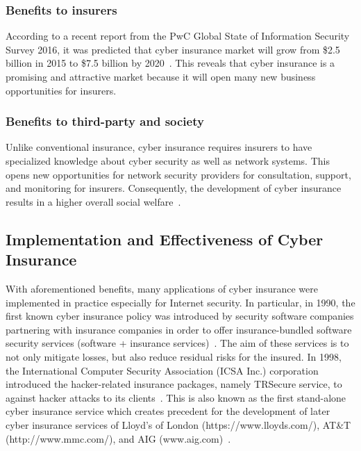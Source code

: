 \documentclass[twocolumn,10pt]{IEEEtran}
\begin{document}
\subsubsection{Benefits to insurers} 

According to a recent report from the PwC Global State of Information Security Survey 2016, it was predicted that cyber insurance market will grow from \$2.5 billion in 2015 to \$7.5 billion by 2020~\cite{online_forbe}. This reveals that cyber insurance is a promising and attractive market because it will open many new business opportunities for insurers. 


\subsubsection{Benefits to third-party and society} 

Unlike conventional insurance, cyber insurance requires insurers to have specialized knowledge about cyber security as well as network systems. This opens new opportunities for network security providers for consultation, support, and monitoring for insurers. Consequently, the development of cyber insurance results in a higher overall social welfare~\cite{Kesan2004The}. 



\subsection{Implementation and Effectiveness of Cyber Insurance}

With aforementioned benefits, many applications of cyber insurance were implemented in practice especially for Internet security. In particular, in 1990, the first known cyber insurance policy was introduced by security software companies partnering with insurance companies in order to offer insurance-bundled software security services (software + insurance services)~\cite{Lelarge2009Economic}. The aim of these services is to not only mitigate losses, but also reduce residual risks for the insured. In 1998, the International Computer Security Association (ICSA Inc.) corporation introduced the hacker-related insurance packages, namely TRSecure service, to against hacker attacks to its clients~\cite{Poletti1998_First}. This is also known as the first stand-alone cyber insurance service which creates precedent for the development of later cyber insurance services of Lloyd's of London (https://www.lloyds.com/), AT\&T (http://www.mmc.com/), and AIG (www.aig.com)~\cite{Majuca2005_The}. 
\end{document}
